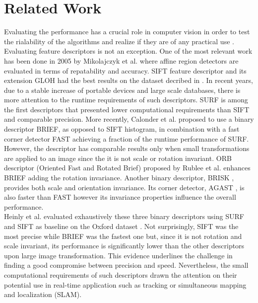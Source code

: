 \section{Related Work}
\label{sec:relatedwork}

Evaluating the performance has a crucial role in computer vision in order to test the rialability of the algorithms and realize if they are of any practical use \cite{christensen02,butler12,wu2013}. Evaluating feature descriptors is not an exception. One of the most relevant work has been done in 2005 by Mikolajczyk et al. \cite{mikolajczyk05} where affine region detectors are evaluated in terms of repatability and accuracy. SIFT feature descriptor \cite{lowe04} and its extension GLOH \cite{mikolajczyk05} had the best results on the dataset decribed in \cite{mikolajczyk2005b}. In recent years, due to a stable increase of portable devices and large scale databases, there is more attention to the runtime requirements of such descriptors. SURF \cite{bay2008} is among the first descriptors that presented lower computational requirements than SIFT and comparable precision. More recently, Calonder et al. \cite{calonder10} proposed to use a binary descriptor BRIEF, as opposed to SIFT histogram, in combination with a fast corner detector FAST \cite{rosten06} achieving a fraction of the runtime performance of SURF. However, the descriptor has comparable results only when small transformations are applied to an image since the it is not scale or rotation invariant. ORB descriptor (Oriented Fast and Rotated Brief) proposed by Rublee et al. \cite{rublee11} enhances BRIEF adding the rotation invariance. Another binary descriptor, BRISK \cite{leutenegger11}, provides both scale and orientation invariance. Its corner detector, AGAST \cite{mair2010} , is also faster than FAST however its invariance properties influence the overall performance.\\ 
Heinly et al. \cite{heinly2012} evaluated exhaustively these three binary descriptors using SURF and SIFT as baseline on the Oxford dataset \cite{mikolajczyk2005b}. Not surprisingly, SIFT was the most precise while BRIEF was the fastest one but, since it is not rotation and scale invariant, its performance is significantly lower than the other descriptors upon large image transformation. This evidence underlines the challenge in finding a good compromise between precision and speed. Nevertheless, the small computational requirements of such descriptors drawn the attention on their potential use in real-time application such as tracking or simultaneous mapping and localization (SLAM). \\

